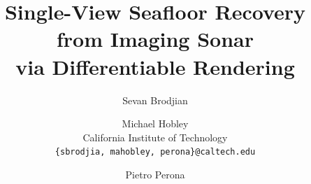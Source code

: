 \documentclass[10pt,twocolumn,letterpaper]{article}
\title{Single-View Seafloor Recovery from Imaging Sonar\\ via Differentiable Rendering}
\author{
  Sevan Brodjian\and
  Michael Hobley \\
  California Institute of Technology\\
  {\tt\small \{sbrodjia, mahobley, perona\}@caltech.edu} \and
  Pietro Perona\\
}
\begin{document}
\maketitle
    







{
    \small
    
    
}

 
\end{document}
